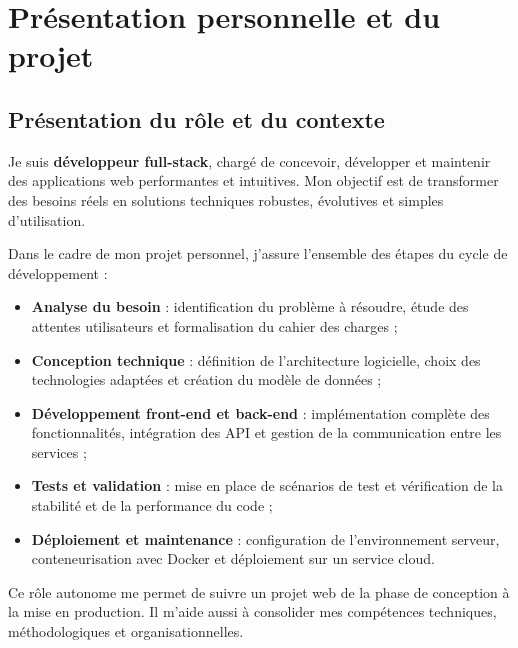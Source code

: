 \chapter{Présentation personnelle et du projet}

\section{Présentation du rôle et du contexte}

\begin{tcolorbox}[colback=blue!5!white,colframe=blue!60!black,title=\textbf{Mon rôle}]
Je suis \textbf{développeur full-stack}, chargé de concevoir, développer et maintenir des applications web performantes et intuitives.  
Mon objectif est de transformer des besoins réels en solutions techniques robustes, évolutives et simples d'utilisation.

Dans le cadre de mon projet personnel, j'assure l'ensemble des étapes du cycle de développement :
\begin{itemize}
    \item \textbf{Analyse du besoin} : identification du problème à résoudre, étude des attentes utilisateurs et formalisation du cahier des charges ;
    \item \textbf{Conception technique} : définition de l'architecture logicielle, choix des technologies adaptées et création du modèle de données ;
    \item \textbf{Développement front-end et back-end} : implémentation complète des fonctionnalités, intégration des API et gestion de la communication entre les services ;
    \item \textbf{Tests et validation} : mise en place de scénarios de test et vérification de la stabilité et de la performance du code ;
    \item \textbf{Déploiement et maintenance} : configuration de l'environnement serveur, conteneurisation avec Docker et déploiement sur un service cloud.
\end{itemize}

Ce rôle autonome me permet de suivre un projet web de la phase de conception à la mise en production. Il m'aide aussi à consolider mes compétences techniques, méthodologiques et organisationnelles.
\end{tcolorbox}

